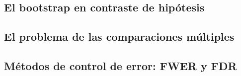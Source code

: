 \documentclass[
]{article}
\begin{document}
\subsection{El bootstrap en contraste de hipótesis}\label{el-bootstrap-en-contraste-de-hipuxf3tesis}

\subsection{El problema de las comparaciones múltiples}\label{el-problema-de-las-comparaciones-muxfaltiples}

\subsection{Métodos de control de error: FWER y FDR}\label{muxe9todos-de-control-de-error-fwer-y-fdr}
\end{document}
